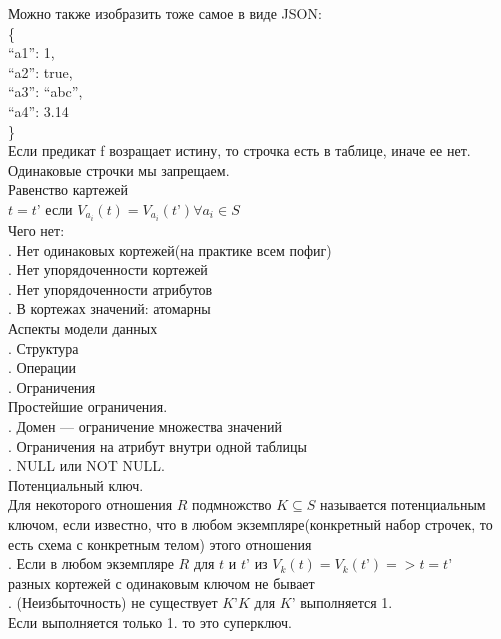\noindent Можно также изобразить тоже самое в виде JSON: \\

\noindent \{ \\
\indent“a1”: 1,
\\\indent“a2”: true,
\\\indent“a3”: “abc”,
\\\indent“a4”: 3.14
\\\noindent \} \\

\noindent Если предикат f возращает истину, то строчка есть в таблице, иначе ее нет. \\
\noindent Одинаковые строчки мы запрещаем. \\

\noindent Равенство картежей \\
\noindent $t = t’$ если $V_{a_i}(t) = V_{a_i}(t’) \forall a_i \in S$ \\

\noindent Чего нет: \\
. Нет одинаковых кортежей(на практике всем пофиг) \\
. Нет упорядоченности кортежей \\
. Нет упорядоченности атрибутов \\
. В кортежах значений: атомарны \\

\noindent Аспекты модели данных \\

. Структура \\
. Операции \\
. Ограничения \\

\noindent Простейшие ограничения. \\
. Домен — ограничение множества значений \\
. Ограничения на атрибут внутри одной таблицы \\
. NULL или NOT NULL. \\


\noindent Потенциальный ключ. \\
\noindent Для некоторого отношения $R$ подмножство $K \subseteq
 S$ называется потенциальным ключом, если известно, что в любом экземпляре(конкретный набор строчек, то есть схема с конкретным телом) этого отношения \\
. Если в любом экземпляре $R$ для $t$ и $t’$ из $V_k(t) = V_k(t’) => t = t’$ \\
\noindent разных кортежей с одинаковым ключом не бывает \\
. (Неизбыточность) не существует $K’ 
 K$ для $K’$ выполняется 1. \\
\noindent Если выполняется только 1. то это суперключ. \\

